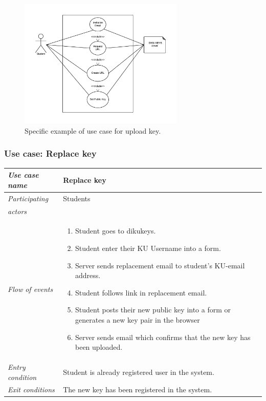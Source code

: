 \documentclass[11pt,a4paper]{report}
\begin{document}
\begin{figure}[H]
    \centering
    \includegraphics[width=0.7\textwidth]{pictures/use_case_pksu_del2_b_example}
    \caption{Specific example of use case for upload key.}
    \label{fig:use_case_diagram_example}
\end{figure}


\subsubsection{Use case: Replace key}
\begin{tabular}{l p{}}
    \toprule
    \textit{Use case name} & Replace key \\
    \midrule
    \textit{Participating} & Students \\
    \textit{actors} & \\
    \midrule
    \textit{Flow of events} &
    \vspace{-6.7mm} \begin{enumerate}
        \item Student goes to dikukeys.
        \item Student enter their KU Username into a form.
        \item Server sends replacement email to student's KU-email address.
        \item Student follows link in replacement email.
        \item Student posts their new public key into a form or generates a new key pair in the browser
        \item Server sends email which confirms that the new key has been uploaded.
    \end{enumerate}
    \\
    \midrule
    \textit{Entry condition} & Student is already registered user in the system. \\
    \midrule
    \textit{Exit conditions} & The new key has been registered in the system. \\
    \bottomrule
\end{tabular}
\end{document}
